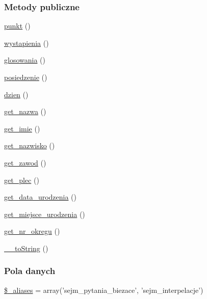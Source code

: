 \subsubsection*{Metody publiczne}
\begin{DoxyCompactItemize}
\item 
\hyperlink{classep___sejm___pytanie___biezace_a33d6419a012729a56ab84c223a587ee2}{punkt} ()
\item 
\hyperlink{classep___sejm___pytanie___biezace_a18b1bf1c04262c23e5edc5c81a4f897c}{wystapienia} ()
\item 
\hyperlink{classep___sejm___pytanie___biezace_a053e53f5c6126e89ed49774ba8f12ec9}{glosowania} ()
\item 
\hyperlink{classep___sejm___pytanie___biezace_abfdc29f0533665ad6c77341c5fa3f7c7}{posiedzenie} ()
\item 
\hyperlink{classep___sejm___pytanie___biezace_a211a968a9f3aa1e4a58516f8c344ec00}{dzien} ()
\item 
\hyperlink{classep___sejm___pytanie___biezace_ac0818f0049d7b84f08f77128f54cee36}{get\-\_\-nazwa} ()
\item 
\hyperlink{classep___sejm___pytanie___biezace_ac4b0c85dc2a130038f2d118dbd0c3d77}{get\-\_\-imie} ()
\item 
\hyperlink{classep___sejm___pytanie___biezace_abdd1d7ff92508da7f748ba1feec97af0}{get\-\_\-nazwisko} ()
\item 
\hyperlink{classep___sejm___pytanie___biezace_af80ca8310b60004454dd02a387deaa2c}{get\-\_\-zawod} ()
\item 
\hyperlink{classep___sejm___pytanie___biezace_ac7f9af5c3fa024e4c26a7b6bd4ce4bb4}{get\-\_\-plec} ()
\item 
\hyperlink{classep___sejm___pytanie___biezace_a880b240cd2d8c336fd1709bf0cb1ae2c}{get\-\_\-data\-\_\-urodzenia} ()
\item 
\hyperlink{classep___sejm___pytanie___biezace_ac57c08ec5e394a19c5bd9280c8376182}{get\-\_\-miejsce\-\_\-urodzenia} ()
\item 
\hyperlink{classep___sejm___pytanie___biezace_a2645a9f0aa5b0ccc482943348c033d0a}{get\-\_\-nr\-\_\-okregu} ()
\item 
\hyperlink{classep___sejm___pytanie___biezace_a7516ca30af0db3cdbf9a7739b48ce91d}{\-\_\-\-\_\-to\-String} ()
\end{DoxyCompactItemize}
\subsubsection*{Pola danych}
\begin{DoxyCompactItemize}
\item 
\hyperlink{classep___sejm___pytanie___biezace_ab4e31d75f0bc5d512456911e5d01366b}{\$\-\_\-aliases} = array('sejm\-\_\-pytania\-\_\-biezace', 'sejm\-\_\-interpelacje')
\end{DoxyCompactItemize}
